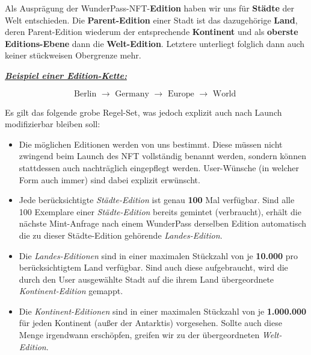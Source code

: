 \begin{NFT-Prop}[Edition]

Als Ausprägung der WunderPass-NFT-\textbf{Edition} haben wir uns für \textbf{Städte} der Welt entschieden. Die \textbf{Parent-Edition} einer Stadt ist das dazugehörige \textbf{Land}, deren 
Parent-Edition wiederum der entsprechende \textbf{Kontinent} und als \textbf{oberste Editions-Ebene} dann die \textbf{Welt-Edition}. Letztere unterliegt folglich dann auch keiner stückweisen Obergrenze mehr.

\vspace{0.2cm}

\underline{\textbf{\textit{Beispiel einer Edition-Kette:}}}

\vspace{0.2cm}

\begin{equation*}
\textrm{Berlin } \rightarrow \textrm{ Germany } \rightarrow \textrm{ Europe } \rightarrow \textrm{ World }
\end{equation*} 

\vspace{0.2cm}

Es gilt das folgende grobe Regel-Set, was jedoch explizit auch nach Launch modifizierbar bleiben soll:

\begin{itemize}
    \item Die möglichen Editionen werden von uns bestimmt. Diese müssen nicht zwingend beim Launch des NFT vollständig benannt werden, sondern können stattdessen auch nachträglich eingepflegt werden. User-Wünsche (in welcher Form auch immer) sind dabei explizit erwünscht.
    \item Jede berücksichtigte \textit{Städte-Edition} ist genau \textbf{100} Mal verfügbar. Sind alle 100 Exemplare einer \textit{Städte-Edition} bereits gemintet (verbraucht), erhält die nächste Mint-Anfrage nach einem WunderPass derselben Edition automatisch die zu dieser Städte-Edition gehörende \textit{Landes-Edition}.
    \item Die \textit{Landes-Editionen} sind in einer maximalen Stückzahl von je \textbf{10.000} pro berücksichtigtem Land verfügbar. Sind auch diese aufgebraucht, wird die durch den User ausgewählte Stadt auf die ihrem Land übergeordnete \textit{Kontinent-Edition} gemappt.
    \item Die \textit{Kontinent-Editionen} sind in einer maximalen Stückzahl von je \textbf{1.000.000} für jeden Kontinent (außer der Antarktis) vorgesehen. Sollte auch diese Menge irgendwann erschöpfen, greifen wir zu der übergeordneten \textit{Welt-Edition}.
\end{itemize} 

\end{NFT-Prop}

